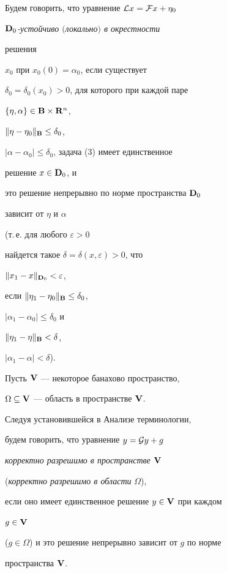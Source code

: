 \begin{defn}


Будем говорить, что уравнение ${\cal L}x={\cal F}x+\eta_0$\;


{\it $\bold {D}_0$-устойчиво $($локально$)$ в окрестности


решения} $x_0$ при $x_0(0)=\alpha_0$, если существует


$\delta_0=\delta_0(x_0)>0$, для которого при каждой паре


$\{\eta,\alpha\}\in\bold {B}\times\bold {R}^n$,


$\|\eta-\eta_0\|_{\bold B}\le\delta_0$,


$|\alpha-\alpha_0|\le\delta_0$, задача (3) имеет единственное


решение $x\in\bold {D}_0$, и


это решение непрерывно по норме пространства $\bold {D}_0$


зависит от $\eta$ и $\alpha$


(т.\,е. для любого $\varepsilon>0$


найдется такое $\delta=\delta(x,\varepsilon)>0$, что


$\|x_1-x\|_{\bold{D}_0}<\varepsilon$,


если $\|\eta_1-\eta_0\|_{\bold B}\le\delta_0$,


$|\alpha_1-\alpha_0|\le\delta_0$ и


$\|\eta_1-\eta\|_{\bold B}<\delta$,


$|\alpha_1-\alpha|<\delta$).


\end{defn}





Пусть $\bold {V}$ --- некоторое банахово пространство,


$\Omega\subseteq\bold {V}$ --- область в пространстве $\bold {V}$.


Следуя установившейся в Анализе терминологии,


будем говорить, что уравнение $y={\cal G}y+g$


{\it корректно разрешимо в пространстве} $\bold {V}$


({\it корректно разрешимо в области} $\Omega$),


если оно имеет единственное решение $y\in\bold {V}$ при каждом


$g\in\bold {V}$


($g\in\Omega$) и это решение непрерывно зависит от $g$ по норме


пространства $\bold {V}$.





